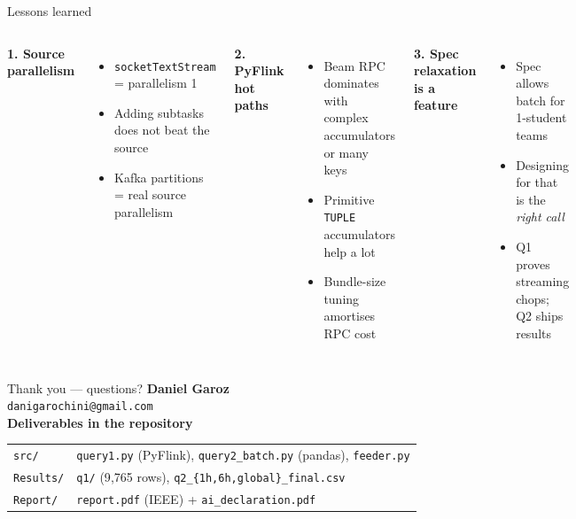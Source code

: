 \documentclass[aspectratio=169,10pt]{beamer}
\begin{document}
\begin{frame}{Lessons learned}
\begin{columns}[T,onlytextwidth]
{\color{sabdNavy}\textbf{1. Source parallelism}}
\begin{itemize}\footnotesize
  \item \texttt{socketTextStream} = parallelism 1
  \item Adding subtasks does not beat the source
  \item Kafka partitions = real source parallelism
\end{itemize}

{\color{sabdNavy}\textbf{2. PyFlink hot paths}}
\begin{itemize}\footnotesize
  \item Beam RPC dominates with complex accumulators or many keys
  \item Primitive \texttt{TUPLE} accumulators help a lot
  \item Bundle-size tuning amortises RPC cost
\end{itemize}

{\color{sabdOrange}\textbf{3. Spec relaxation is a feature}}
\begin{itemize}\footnotesize
  \item Spec allows batch for 1-student teams
  \item Designing for that is the \textit{right call}
  \item Q1 proves streaming chops; Q2 ships results
\end{itemize}
\end{columns}
\end{frame}

\begin{frame}{Thank you — questions?}
\vspace{0.5em}
\centering
{\Huge\color{sabdNavy}\textbf{Daniel Garoz}}\\[0.4em]
\texttt{danigarochini@gmail.com}\\[1.5em]

{\color{sabdNavy}\textbf{Deliverables in the repository}}
\vspace{0.4em}

\begin{tabular}{ll}
\texttt{src/} & \texttt{query1.py} (PyFlink), \texttt{query2\_batch.py} (pandas), \texttt{feeder.py} \\
\texttt{Results/} & \texttt{q1/} (9{,}765 rows), \texttt{q2\_\{1h,6h,global\}\_final.csv} \\
\texttt{Report/} & \texttt{report.pdf} (IEEE) + \texttt{ai\_declaration.pdf} \\
\end{tabular}
\end{frame}
\end{document}
